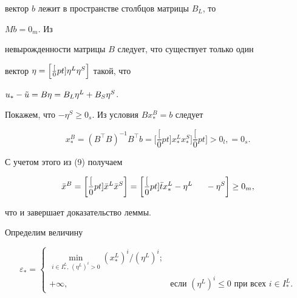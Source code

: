 вектор $b$ лежит в пространстве столбцов матрицы $B_L$, то


$Mb=0_m$. Из


невырожденности матрицы $B$ следует, что существует только один


вектор $\eta=\Bigl[\frac[0pt]{\eta^L}{\eta^S}\Bigr]$ такой, что


$u_*-\Tilde u=B\eta=B_L\eta^L+B_S\eta^S$.


Покажем, что $-\eta^S\ge 0_s$. Из условия $Bx^B_*=b$ следует


$$


x^B_*=(B^\top B)^{-1}B^\top b=


\biggl[\frac[0pt]{x^L_*}{x^S_*}\biggr]


\frac[0pt]{>0_l,}{=0_s.}


$$


С учетом этого из (9) получаем


\begin{equation}


\Bar x^B=


\biggl[\frac[0pt]{\Bar x^L}{\Bar x^S}\biggr]=


\biggl[\frac[0pt]{\Bar tx^L_*-\eta^L}


{{\phantom{\Bar tx^L_*}}-\eta^S}\biggr]\ge 0_m,


\end{equation}


что и завершает доказательство леммы.


\medskip





Определим величину


\begin{equation}


\varepsilon_*=


\begin{cases}


\min\limits_{i\in I^L_*,\,(\eta^L)^i>0}(x^L_*)^i/(\eta^L)^i; & \\


+\infty, &\text{если } (\eta^L)^i\le 0 \text{ при всех }i\in I^L_*.


\end{cases}


\end{equation}





